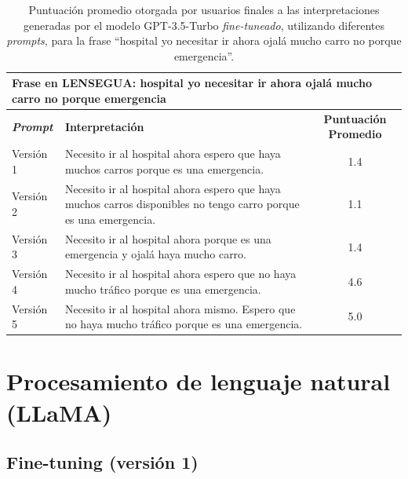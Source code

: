 \vspace{0.5cm}
\begin{table}[H]
\centering
    \begin{tabular}{|l|p{8cm}|c|}
        \hline
        \multicolumn{3}{|l|}{\textbf{Frase en LENSEGUA:} hospital yo necesitar ir ahora ojalá mucho carro no porque emergencia} \\ \hline \hline
        \textbf{\textit{Prompt}} & \textbf{Interpretación} & \textbf{Puntuación Promedio} \\ \hline
        Versión 1 & Necesito ir al hospital ahora espero que haya muchos carros porque es una emergencia. & 1.4 \\ \hline
        Versión 2 & Necesito ir al hospital ahora espero que haya muchos carros disponibles no tengo carro porque es una emergencia. & 1.1 \\ \hline
        Versión 3 & Necesito ir al hospital ahora porque es una emergencia y ojalá haya mucho carro. & 1.4 \\ \hline
        Versión 4 & Necesito ir al hospital ahora espero que no haya mucho tráfico porque es una emergencia. & 4.6 \\ \hline
        Versión 5 & Necesito ir al hospital ahora mismo. Espero que no haya mucho tráfico porque es una emergencia. & 5.0 \\ \hline

    \end{tabular}
    \caption{Puntuación promedio otorgada por usuarios finales a las interpretaciones generadas por el modelo GPT-3.5-Turbo \textit{fine-tuneado}, utilizando diferentes \textit{prompts}, para la frase “hospital yo necesitar ir ahora ojalá mucho carro no porque emergencia”.}
    \label{tab:R6}
\end{table}














\section{Procesamiento de lenguaje natural (LLaMA)} 

\subsection{Fine-tuning (versión 1)}

